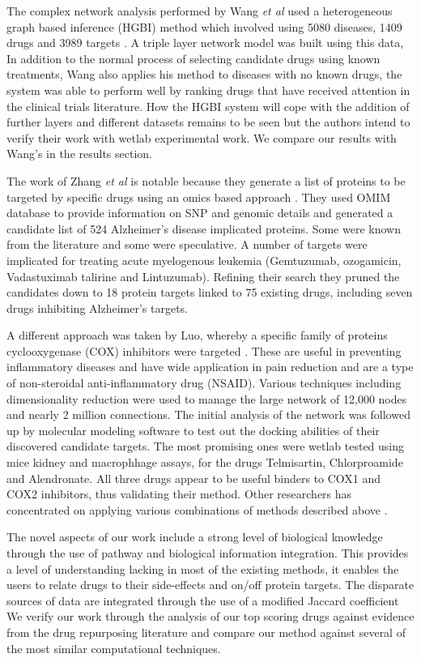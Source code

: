 \documentclass[preprint,11pt]{elsarticle}
\begin{document}
The complex network analysis performed by Wang {\it et al} used a heterogeneous graph based inference (HGBI) method which involved using 5080 diseases, 1409 drugs and 3989 targets \cite{Wang2014}. A triple layer network model was built using this data,  In addition to the normal process of selecting candidate drugs using known treatments, Wang also applies his method to diseases with no known drugs, the system was able to perform well by ranking drugs that have received attention in the clinical trials literature. How the HGBI system  will cope with the addition of further layers and different datasets remains to be seen but the authors intend to verify their work with wetlab experimental work. We compare our results with Wang's in the results section.

The work of Zhang {\it et al} is notable because they generate a list of proteins to be targeted by specific drugs using an omics based approach \cite{Zhang2016}. They used OMIM database to provide information on SNP and genomic details and generated a candidate list of 524 Alzheimer's disease implicated proteins. Some were known from the literature and some were speculative. A number of targets were implicated for treating acute myelogenous leukemia (Gemtuzumab, ozogamicin, Vadastuximab talirine and Lintuzumab). Refining their search they pruned the candidates down to 18 protein targets linked to 75 existing drugs, including seven  drugs inhibiting Alzheimer's targets.

A different approach was taken by Luo, whereby a specific family of proteins cyclooxygenase (COX) inhibitors were targeted \cite{Luo2016,Luo2017}. These are useful in preventing inflammatory diseases and have wide application in pain reduction and are a type of non-steroidal anti-inflammatory drug (NSAID). Various techniques including dimensionality reduction were used to  manage the large network of 12,000 nodes and nearly 2 million connections. The initial analysis of the network was followed up by molecular modeling software to test out the docking abilities of their discovered candidate targets. The most promising ones were wetlab tested using mice kidney and macrophhage assays, for the drugs Telmisartin, Chlorproamide and Alendronate. All three drugs appear to be useful binders to COX1 and COX2 inhibitors, thus validating their method. Other researchers has concentrated on applying various combinations of methods described above \cite{Ye2014, XWang2013, Liu2016, TLiu2015,ChaoWu2013}.

The novel aspects of our work include a strong level of biological knowledge  through the use of pathway and biological information  integration. This provides a level of understanding lacking in most of the existing methods, it enables the users to relate drugs to their side-effects and on/off protein targets. The disparate sources of data are integrated through the use of a modified Jaccard coefficient We verify our work through the analysis of our top scoring drugs against evidence from the drug repurposing literature and compare our method against several of the most similar computational techniques. 
\end{document}
